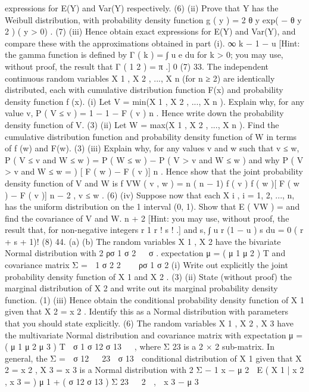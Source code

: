 expressions for E(Y) and Var(Y) respectively.
(6)
(ii) Prove that Y has the Weibull distribution, with probability density function
g ( y ) = 2 θ y exp( − θ y 2 ) ( y > 0) .
(7)
(iii) Hence obtain exact expressions for E(Y) and Var(Y), and compare these with
the approximations obtained in part (i).
∞
k − 1 − u
[Hint: the gamma function is defined by Γ ( k ) =
∫ u e du for k > 0; you
may use, without proof, the result that Γ (
1
2
) = π .]
0
(7)
33.
The independent continuous random variables X 1 , X 2 , ..., X n (for n ≥ 2) are identically
distributed, each with cumulative distribution function F(x) and probability density
function f (x).
(i)
Let V = min(X 1 , X 2 , ..., X n ). Explain why, for any value v,
P ( V ≤ v ) = 1 − {1 − F ( v )} n .
Hence write down the probability density function of V.
(3)
(ii) Let W = max(X 1 , X 2 , ..., X n ). Find the cumulative distribution function and
probability density function of W in terms of f (w) and F(w).
(3)
(iii) Explain why, for any values v and w such that v ≤ w,
P ( V ≤ v and W ≤ w ) =
P ( W ≤ w ) − P ( V > v and W ≤ w )
and why
P ( V > v and W ≤ w =
) [ F ( w ) − F ( v )] n .
Hence show that the joint probability density function of V and W is
f VW ( v , w ) =
n ( n − 1) f ( v ) f ( w )[ F ( w ) − F ( v )] n − 2 , v ≤ w .
(6)
(iv)
Suppose now that each X i , i = 1, 2, ..., n, has the uniform distribution on the
1
interval (0, 1). Show that E ( VW ) =
and find the covariance of V and W.
n + 2
[Hint: you may use, without proof, the result that, for non-negative integers r
1
r ! s !
.]
and s, ∫ u r (1 − u ) s du =
0
( r + s + 1)!
(8)
44.
(a)
(b)
The random variables X 1 , X 2 have the bivariate Normal distribution with
2
ρσ 1 σ 2 
 σ
.
expectation μ = ( μ 1 μ 2 ) T and covariance matrix Σ =  1
σ 2 2  
 ρσ 1 σ 2
(i) Write out explicitly the joint probability density function of X 1 and X 2 .
(3)
(ii) State (without proof) the marginal distribution of X 2 and write out its
marginal probability density function.
(1)
(iii) Hence obtain the conditional probability density function of X 1 given
that X 2 = x 2 . Identify this as a Normal distribution with parameters that
you should state explicitly.
(6)
The random variables X 1 , X 2 , X 3 have the multivariate Normal distribution
and
covariance
matrix
with
expectation
μ = ( μ 1 μ 2 μ 3 ) T
 σ 1 σ 12 σ 13 
 , where Σ 23 is a 2 × 2 sub-matrix. In general, the
Σ =  σ 12


23
 σ 13

conditional distribution of X 1 given that X 2 = x 2 , X 3 = x 3 is a Normal
distribution with
2
Σ
− 1 x − μ 2 
E ( X 1 | x 2 , x 3 =
) μ 1 + ( σ 12 σ 13 ) Σ 23   2
 ,
 x 3 − μ 3 
